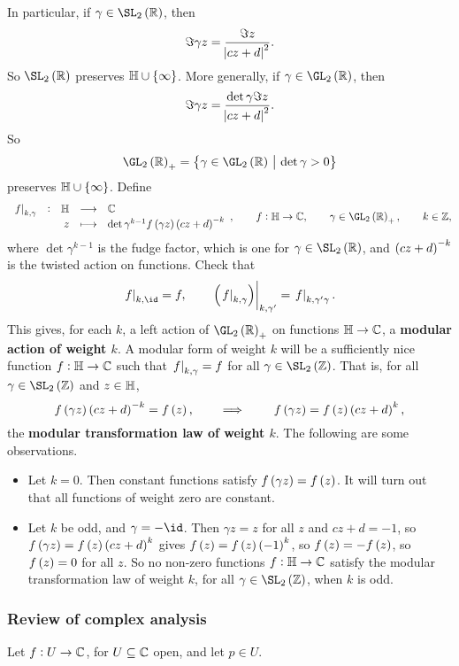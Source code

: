 In particular, if $ \gamma \in \SL_2\br{\RR} $, then
$$ \Im \gamma z = \dfrac{\Im z}{\abs{cz + d}^2}. $$
So $ \SL_2\br{\RR} $ preserves $ \HH \cup \cbr{\infty} $. More generally, if $ \gamma \in \GL_2\br{\RR} $, then
$$ \Im \gamma z = \dfrac{\det \gamma\Im z}{\abs{cz + d}^2}. $$
So
$$ \GL_2\br{\RR}_+ = \cbr{\gamma \in \GL_2\br{\RR} \st \det \gamma > 0} $$
preserves $ \HH \cup \cbr{\infty} $. Define
$$ \function[\eval{f}_{k, \gamma}]{\HH}{\CC}{z}{\det \gamma^{k - 1}f\br{\gamma z}\br{cz + d}^{-k}}, \qquad f : \HH \to \CC, \qquad \gamma \in \GL_2\br{\RR}_+, \qquad k \in \ZZ, $$
where $ \det \gamma^{k - 1} $ is the fudge factor, which is one for $ \gamma \in \SL_2\br{\RR} $, and $ \br{cz + d}^{-k} $ is the twisted action on functions. Check that
$$ \eval{f}_{k, \id} = f, \qquad \eval{\br{\eval{f}_{k, \gamma}}}_{k, \gamma'} = \eval{f}_{k, \gamma'\gamma}. $$
This gives, for each $ k $, a left action of $ \GL_2\br{\RR}_+ $ on functions $ \mathbb{H} \to \mathbb{C} $, a \textbf{modular action of weight $ k $}. A modular form of weight $ k $ will be a sufficiently nice function $ f : \mathbb{H} \to \mathbb{C} $ such that $ \left. f \right|_{k, \gamma} = f $ for all $ \gamma \in \SL_2\br{\ZZ} $. That is, for all $ \gamma \in \SL_2\br{\ZZ} $ and $ z \in \mathbb{H} $,
$$ f\br{\gamma z}\br{cz + d}^{-k} = f\br{z}, \qquad \implies \qquad f\br{\gamma z} = f\br{z}\br{cz + d}^k, $$
the \textbf{modular transformation law of weight $ k $}. The following are some observations.
\begin{itemize}
\item Let $ k = 0 $. Then constant functions satisfy $ f\br{\gamma z} = f\br{z} $. It will turn out that all functions of weight zero are constant.
\item Let $ k $ be odd, and $ \gamma = -\id $. Then $ \gamma z = z $ for all $ z $ and $ cz + d = -1 $, so $ f\br{\gamma z} = f\br{z}\br{cz + d}^k $ gives $ f\br{z} = f\br{z}\br{-1}^k $, so $ f\br{z} = -f\br{z} $, so $ f\br{z} = 0 $ for all $ z $. So no non-zero functions $ f : \mathbb{H} \to \mathbb{C} $ satisfy the modular transformation law of weight $ k $, for all $ \gamma \in \SL_2\br{\ZZ} $, when $ k $ is odd.
\end{itemize}

\pagebreak

\subsubsection{Review of complex analysis}

Let $ f : U \to \mathbb{C} $, for $ U \subseteq \mathbb{C} $ open, and let $ p \in U $.

